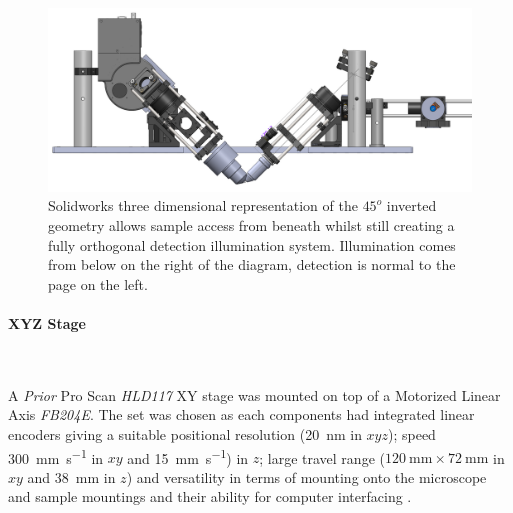 \begin{figure}
\centering
\includegraphics[width=1\linewidth]{./Raster/solidworks_design_front}
\caption[CAD design of the $45^o$ detection and excitation]{Solidworks three dimensional representation of the $45^o$ inverted geometry allows sample access from beneath whilst still creating a fully orthogonal detection illumination system.
Illumination comes from below on the right of the diagram, detection is normal to the page on the left.}
\label{fig:solidworks_design_front}
\end{figure}

\paragraph{XYZ Stage}~

A \emph{Prior} Pro Scan \textit{HLD117} XY stage was mounted on top of a Motorized Linear Axis \textit{FB204E}.
The set was chosen as each components had integrated linear encoders giving a suitable positional resolution (\SI{20}{\nano\meter} in $xyz$);
speed \SI{300}{\milli\meter\per\second} in $xy$ and \SI{15}{\milli\meter\per\second}) in $z$;
large travel range ($\SI{120}{\milli\meter} \times \SI{72}{\milli\meter} $ in $xy$ and \SI{38}{\milli\meter} in $z$) and versatility in terms of mounting onto the microscope and sample mountings and their ability for computer interfacing \cite{Hu2014}.
%
%

